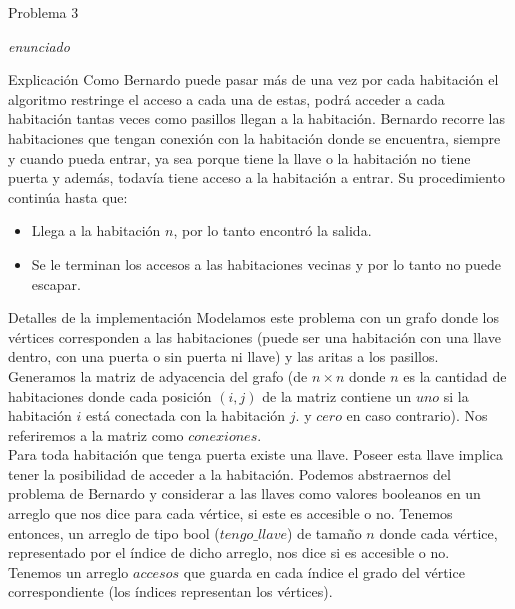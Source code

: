 \begin{section}{Problema 3}

	\textit{enunciado}

	\begin{subsection}{Explicación}
		Como Bernardo puede pasar más de una vez por cada habitación el algoritmo restringe el acceso a cada una de estas, podrá acceder a cada habitación tantas veces como pasillos llegan a la habitación.
		Bernardo recorre las habitaciones que tengan conexión con la habitación donde se encuentra, siempre y cuando pueda entrar, ya sea porque tiene la llave o la habitación no tiene puerta y además, todavía tiene acceso a la habitación a entrar. Su procedimiento continúa hasta que:
		\begin{itemize}
			\item Llega a la habitación $n$, por lo tanto encontró la salida.
			\item Se le terminan los accesos a las habitaciones vecinas y por lo tanto no puede escapar.
		\end{itemize}

	\end{subsection}

	\begin{subsection}{Detalles de la implementación}
		Modelamos este problema con un grafo donde los vértices corresponden a las habitaciones (puede ser una habitación con una llave dentro, con una puerta o sin puerta ni llave) y las aritas a los pasillos.\\	

		Generamos la matriz de adyacencia del grafo (de $n\times n$ donde $n$ es la cantidad de habitaciones donde cada posición $(i,j)$ de la matriz contiene un $uno$ si la habitación $i$ está conectada con la habitación $j$. y $cero$ en caso contrario). Nos referiremos a la matriz como $conexiones$.\\

		Para toda habitación que tenga puerta existe una llave. Poseer esta llave implica tener la posibilidad de acceder a la habitación. Podemos abstraernos del problema de Bernardo y considerar a las llaves como valores booleanos en un arreglo que nos dice para cada vértice, si este es accesible o no. Tenemos entonces, un arreglo de tipo bool ($tengo\_llave$) de tamaño $n$ donde cada vértice, representado por el índice de dicho arreglo, nos dice si es accesible o no.\\

		Tenemos un arreglo $accesos$ que guarda en cada índice el grado del vértice correspondiente (los índices representan los vértices).\\


\end{subsection}
\end{section}
